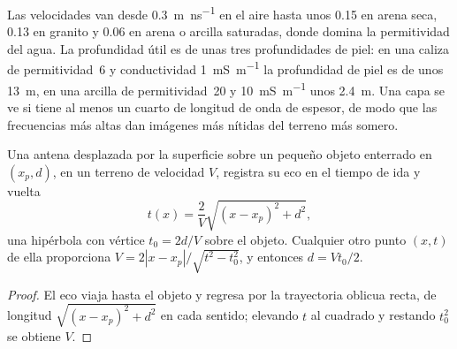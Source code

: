 Las velocidades van desde \qty{0.3}{m.ns^{-1}} en el aire hasta unos \num{0.15} en
arena seca, \num{0.13} en granito y \num{0.06} en arena o
arcilla saturadas, donde domina la permitividad del agua. La profundidad útil
es de unas tres profundidades de piel: en una caliza de permitividad~6 y
conductividad \qty{1}{mS.m^{-1}} la profundidad de piel es de unos \qty{13}{m},
en una arcilla de permitividad~20 y \qty{10}{mS.m^{-1}} unos
\qty{2.4}{m}. Una capa se ve si tiene al menos un cuarto de
longitud de onda de espesor, de modo que las frecuencias más altas dan imágenes más nítidas del
terreno más somero.

\begin{proposition}\label{prop:b3:field-lab-methods-3:hyperbola}
Una antena desplazada por la superficie sobre un pequeño objeto enterrado en
$(x_p, d)$, en un terreno de velocidad $V$, registra su eco en el
tiempo de ida y vuelta
\[
t(x) = \frac{2}{V}\sqrt{(x - x_p)^2 + d^2} ,
\]
una hipérbola con vértice $t_0 = 2d/V$ sobre el objeto. Cualquier otro punto
$(x, t)$ de ella proporciona $V = 2|x - x_p|/\sqrt{t^2 - t_0^2}$, y entonces $d =
Vt_0/2$.
\end{proposition}

\begin{proof}
El eco viaja hasta el objeto y regresa por la trayectoria oblicua recta,
de longitud $\sqrt{(x - x_p)^2 + d^2}$ en cada sentido; elevando $t$ al cuadrado y
restando $t_0^2$ se obtiene $V$.
\end{proof}

